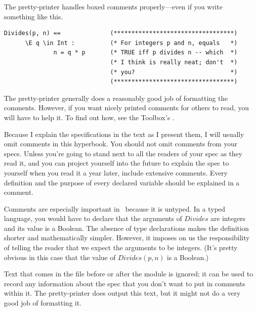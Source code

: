 \documentclass[fleqn,leqno]{article}
\begin{document}
The pretty-printer handles boxed comments properly---even if
you write something like 
this.
\begin{widedisplay}
\begin{verbatim}
Divides(p, n) ==              (**********************************)
      \E q \in Int :          (* For integers p and n, equals   *)
              n = q * p       (* TRUE iff p divides n -- which  *)
                              (* I think is really neat; don't  *)
                              (* you?                           *)
                              (**********************************)
\end{verbatim}
\end{widedisplay}
The pretty-printer generally does a reasonably good job of formatting
the comments.  However, if you want nicely
printed comments for others to
read, you will have to help it.  To find out how, see the Toolbox's
.

Because I explain the specifications in the text as I present them, I
will usually omit comments in this hyperbook.  You should not omit
comments from your specs.  Unless you're going to stand next to all
the readers of your spec as they read it, and you can project yourself
into the future to explain the spec to yourself when you read it a
year later, include extensive comments.  Every definition and the
purpose of every declared variable should be explained in a comment.

Comments are especially important in \tlaplus\ because it is untyped.
In a typed language, you would have to declare that the arguments of
$Divides$ are integers and its value is a Boolean.  The absence of
type declarations makes the definition shorter and mathematically
simpler.  However, it imposes on us the responsibility%
of telling the reader that we expect the arguments to be integers.
(It's pretty obvious in this case that the value of
$Divides(p,n)$ is a Boolean.)

Text that comes in the file before or after the module is ignored; it
can be used to record any information about the spec that you don't
want to put in comments within it.  The pretty-printer does output
this text, but it might not do a very good job of formatting it.
\end{document}
